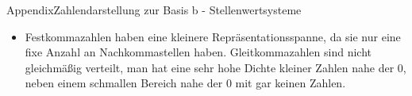 \begin{frame}[allowframebreaks]{Appendix}{Zahlendarstellung zur Basis b - Stellenwertsysteme\vspace{0.5cm}}
\begin{itemize}
\begin{Sidenote}
\begin{itemize}
        \item \alert{Festkommazahlen} haben eine \alert{kleinere Repräsentationsspanne}, da sie nur eine \alert{fixe Anzahl an Nachkommastellen} haben. Gleitkommazahlen sind \alert{nicht gleichmäßig verteilt}, man hat eine sehr \alert{hohe Dichte kleiner Zahlen} nahe der $0$, neben einem schmallen Bereich nahe der $0$ mit gar keinen Zahlen.
      \end{itemize}
    \end{Sidenote}
  \end{itemize}
\end{frame}

